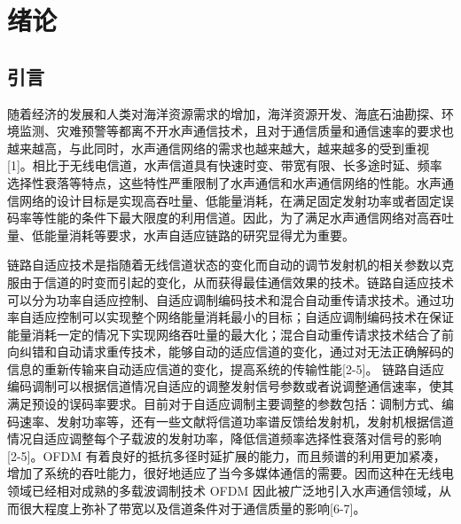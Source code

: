 \chapter{绪论}
\section{引言}
随着经济的发展和人类对海洋资源需求的增加，海洋资源开发、海底石油勘探、环境监测、灾难预警等都离不开水声通信技术，且对于通信质量和通信速率的要求也越来越高，与此同时，水声通信网络的需求也越来越大，越来越多的受到重视[1]。相比于无线电信道，水声信道具有快速时变、带宽有限、长多途时延、频率选择性衰落等特点，这些特性严重限制了水声通信和水声通信网络的性能。水声通信网络的设计目标是实现高吞吐量、低能量消耗，在满足固定发射功率或者固定误码率等性能的条件下最大限度的利用信道。因此，为了满足水声通信网络对高吞吐量、低能量消耗等要求，水声自适应链路的研究显得尤为重要。

链路自适应技术是指随着无线信道状态的变化而自动的调节发射机的相关参数以克服由于信道的时变而引起的变化，从而获得最佳通信效果的技术。链路自适应技术可以分为功率自适应控制、自适应调制编码技术和混合自动重传请求技术。通过功率自适应控制可以实现整个网络能量消耗最小的目标；自适应调制编码技术在保证能量消耗一定的情况下实现网络吞吐量的最大化；混合自动重传请求技术结合了前向纠错和自动请求重传技术，能够自动的适应信道的变化，通过对无法正确解码的信息的重新传输来自动适应信道的变化，提高系统的传输性能[2-5]。 链路自适应编码调制可以根据信道情况自适应的调整发射信号参数或者说调整通信速率，使其满足预设的误码率要求。目前对于自适应调制主要调整的参数包括：调制方式、编码速率、发射功率等，还有一些文献将信道功率谱反馈给发射机，发射机根据信道情况自适应调整每个子载波的发射功率，降低信道频率选择性衰落对信号的影响[2-5]。OFDM 有着良好的抵抗多径时延扩展的能力，而且频谱的利用更加紧凑，增加了系统的吞吐能力，很好地适应了当今多媒体通信的需要。因而这种在无线电领域已经相对成熟的多载波调制技术 OFDM 因此被广泛地引入水声通信领域，从而很大程度上弥补了带宽以及信道条件对于通信质量的影响[6-7]。

